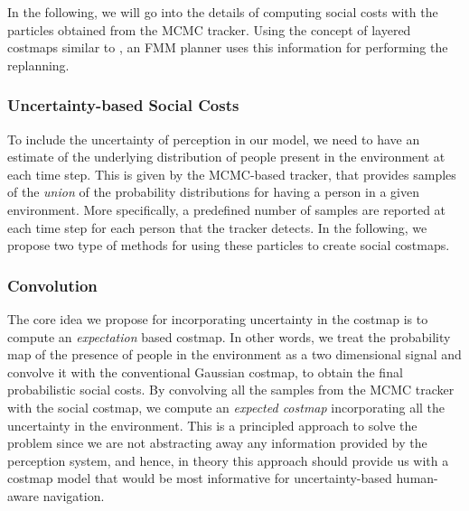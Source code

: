 In the following, we will go into the details of computing social costs with the particles obtained from the MCMC tracker. Using the concept of layered costmaps similar to \cite{lu2014iros}, an FMM planner uses this information for performing the replanning. 
\subsubsection{Uncertainty-based Social Costs}

To include the uncertainty of perception in our model, we need to have an estimate of the underlying distribution of people present in the environment at each time step. This is given by the MCMC-based tracker, that provides samples of the \textit{union} of the probability distributions for having a person in a given environment. More specifically, a predefined number of samples are reported at each time step for each person that the tracker detects. In the following, we propose two type of methods for using these particles to create social costmaps.  

\subsubsection*{Convolution}

The core idea we propose for incorporating uncertainty in the costmap is to compute an \textit{expectation} based costmap. In other words, we treat the probability map of the presence of people in the environment as a two dimensional signal and convolve it with the conventional Gaussian costmap, to obtain the final probabilistic social costs. By convolving all the samples from the MCMC tracker with the social costmap, we compute an \textit{expected costmap} incorporating all the uncertainty in the environment. This is a principled approach to solve the problem since we are not abstracting away any information provided by the perception system, and hence, in theory this approach should provide us with a costmap model that would be most informative for uncertainty-based human-aware navigation.



